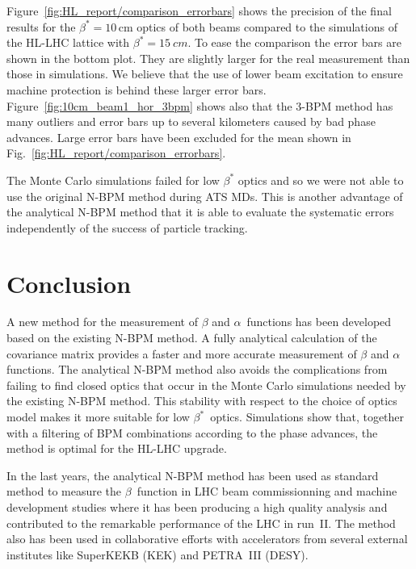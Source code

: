 Figure~\ref{fig:HL_report/comparison_errorbars} shows the precision of the final results for the $ \beta^*=10\,\text{cm} $
optics of both beams compared to the simulations of the HL-LHC lattice with $ \beta^*=\SI{15}{cm} $.
To ease the comparison the error bars are shown in the bottom plot.
They are slightly larger for the real measurement than those in simulations.
We believe that the use of lower beam excitation to ensure machine protection is behind these larger error bars.
Figure~\ref{fig:10cm_beam1_hor_3bpm} shows also that the 3-BPM method has many outliers and error bars up to several
kilometers caused by bad phase advances. Large error bars have been excluded for the mean shown in
Fig.~\ref{fig:HL_report/comparison_errorbars}.



The Monte Carlo simulations failed for low $ \beta^* $ optics and so we were not able to use the original N-BPM method during ATS MDs. This is another advantage of the analytical N-BPM method that it is
able to evaluate the systematic errors independently of the success of particle tracking.

\section{Conclusion}
\label{sec_nbpm_concl}

A new method for the measurement of $\beta$ and $\alpha$~functions has been
developed based on the existing N-BPM method.
A fully analytical calculation of the covariance matrix provides a faster and more accurate measurement
of $ \beta  $ and $ \alpha $ functions. The analytical N-BPM method also avoids the complications from
failing to find closed optics that occur in the Monte Carlo simulations  needed by the existing N-BPM method.
This stability with respect to the choice of optics model makes it more suitable for low $ \beta^* $~optics.
Simulations show that, together with a filtering of BPM combinations according to the phase advances,
the method is optimal for the HL-LHC upgrade. 

In the last years, the analytical N-BPM method has been used as standard method to measure the $\beta$~function in LHC
beam commissionning and machine development studies where it has been producing a high quality analysis
and contributed to the remarkable performance of the LHC in run~II.
The method also has been used in collaborative efforts
with accelerators from several external institutes like SuperKEKB (KEK) and PETRA~III (DESY). 
